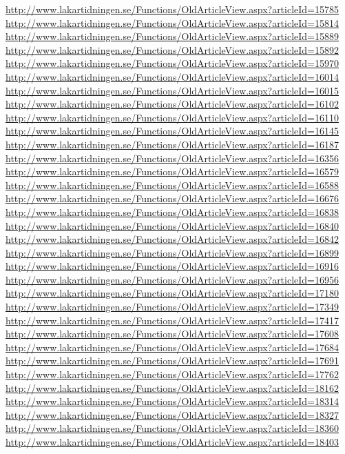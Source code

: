 \documentclass[a4paper]{report}
\begin{document}
\begin{appendices}
\begin{footnotesize}
\url{http://www.lakartidningen.se/Functions/OldArticleView.aspx?articleId=15785}
\url{http://www.lakartidningen.se/Functions/OldArticleView.aspx?articleId=15814}
\url{http://www.lakartidningen.se/Functions/OldArticleView.aspx?articleId=15889}
\url{http://www.lakartidningen.se/Functions/OldArticleView.aspx?articleId=15892}
\url{http://www.lakartidningen.se/Functions/OldArticleView.aspx?articleId=15970}
\url{http://www.lakartidningen.se/Functions/OldArticleView.aspx?articleId=16014}
\url{http://www.lakartidningen.se/Functions/OldArticleView.aspx?articleId=16015}
\url{http://www.lakartidningen.se/Functions/OldArticleView.aspx?articleId=16102}
\url{http://www.lakartidningen.se/Functions/OldArticleView.aspx?articleId=16110}
\url{http://www.lakartidningen.se/Functions/OldArticleView.aspx?articleId=16145}
\url{http://www.lakartidningen.se/Functions/OldArticleView.aspx?articleId=16187}
\url{http://www.lakartidningen.se/Functions/OldArticleView.aspx?articleId=16356}
\url{http://www.lakartidningen.se/Functions/OldArticleView.aspx?articleId=16579}
\url{http://www.lakartidningen.se/Functions/OldArticleView.aspx?articleId=16588}
\url{http://www.lakartidningen.se/Functions/OldArticleView.aspx?articleId=16676}
\url{http://www.lakartidningen.se/Functions/OldArticleView.aspx?articleId=16838}
\url{http://www.lakartidningen.se/Functions/OldArticleView.aspx?articleId=16840}
\url{http://www.lakartidningen.se/Functions/OldArticleView.aspx?articleId=16842}
\url{http://www.lakartidningen.se/Functions/OldArticleView.aspx?articleId=16899}
\url{http://www.lakartidningen.se/Functions/OldArticleView.aspx?articleId=16916}
\url{http://www.lakartidningen.se/Functions/OldArticleView.aspx?articleId=16956}
\url{http://www.lakartidningen.se/Functions/OldArticleView.aspx?articleId=17180}
\url{http://www.lakartidningen.se/Functions/OldArticleView.aspx?articleId=17349}
\url{http://www.lakartidningen.se/Functions/OldArticleView.aspx?articleId=17417}
\url{http://www.lakartidningen.se/Functions/OldArticleView.aspx?articleId=17608}
\url{http://www.lakartidningen.se/Functions/OldArticleView.aspx?articleId=17684}
\url{http://www.lakartidningen.se/Functions/OldArticleView.aspx?articleId=17691}
\url{http://www.lakartidningen.se/Functions/OldArticleView.aspx?articleId=17762}
\url{http://www.lakartidningen.se/Functions/OldArticleView.aspx?articleId=18162}
\url{http://www.lakartidningen.se/Functions/OldArticleView.aspx?articleId=18314}
\url{http://www.lakartidningen.se/Functions/OldArticleView.aspx?articleId=18327}
\url{http://www.lakartidningen.se/Functions/OldArticleView.aspx?articleId=18360}
\url{http://www.lakartidningen.se/Functions/OldArticleView.aspx?articleId=18403}

\end{footnotesize}
\end{appendices}
\end{document}
